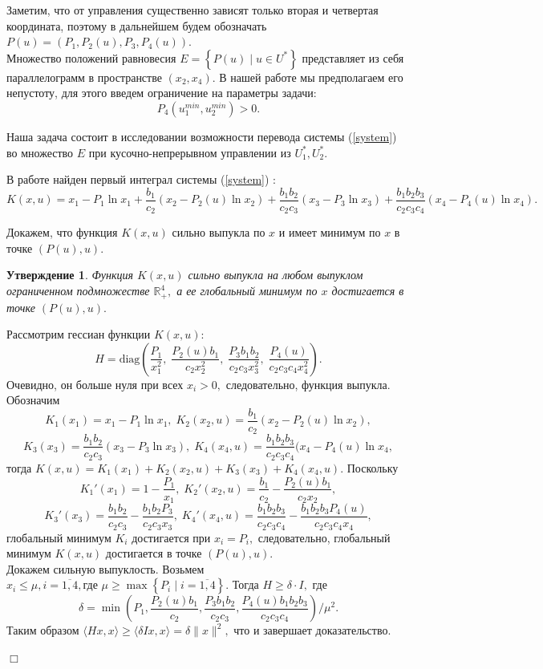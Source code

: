 \documentclass[11pt]{article}
\newtheorem{statement}{Утверждение}
\newenvironment{Proof}
{\par\noindent{\bf Доказательство.\\}} 
{\begin{flushright}$\Box$\end{flushright}}
\newcommand\Set[2]{\left\{ #1 \mid #2 \right\}}
\newcommand\Ref[1]{(\ref{#1})}
\newcommand\ftw[2]{\overline{#1,#2}}
\newcommand\RS{\Ref{system} }
\newcommand\beq{\begin{equation}}
\newcommand\eeq{\end{equation}}
\begin{document}
Заметим, что от управления существенно зависят только вторая и четвертая координата, поэтому в дальнейшем будем обозначать $P(u) = (P_1, P_2(u), P_3, P_4(u)).$ \\

Множество положений равновесия $E = \Set{P(u)}{u \in U^*}$ представляет из себя параллелограмм в пространстве $(x_2, x_4).$ В нашей работе мы предполагаем его непустоту, для этого введем ограничение на параметры задачи:
$$P_4(u_1^{min}, u_2^{min}) > 0.$$

Наша задача состоит в исследовании возможности перевода системы \RS во множество $E$ при кусочно-непрерывном управлении из $U_1^*, U_2^*.$ 

В работе \cite{MathBio} найден первый интеграл системы \RS:
\beq
	K(x,u) = x_1 - P_1\ln x_1 + \frac{b_1}{c_2}(x_2 - P_2(u)\ln x_2) + \frac{b_1b_2}{c_2c_3}(x_3 - P_3\ln x_3) + \frac{b_1b_2b_3}{c_2c_3c_4}(x_4 - P_4(u)\ln x_4).
\eeq

Докажем, что функция $K(x,u)$ сильно выпукла по $x$ и имеет минимум по $x$ в точке $(P(u),u).$

\begin{statement}
	Функция $K(x,u)$ сильно выпукла на любом выпуклом ограниченном подмножестве $\mathbb{R}_+^4,$ а ее глобальный минимум по $x$ достигается в точке $(P(u),u).$
\end{statement}
\begin{Proof}
	Рассмотрим гессиан функции $K(x,u):$
	$$H = \text{diag} \left(\frac{P_1}{x_1^2}, \; \frac{P_2(u)b_1}{c_2x_2^2}, \; \frac{P_3b_1b_2}{c_2c_3x_3^2}, \; \frac{P_4(u)}{c_2c_3c_4x_4^2}\right).$$
	Очевидно, он больше нуля при всех $x_i > 0,$ следовательно, функция выпукла.\\
	Обозначим 
	$$K_1(x_1) = x_1 - P_1\ln x_1, \; K_2(x_2,u) = \frac{b_1}{c_2}(x_2 - P_2(u)\ln x_2),$$
	$$K_3(x_3) = \frac{b_1b_2}{c_2c_3}(x_3 - P_3\ln x_3), \; K_4(x_4,u) = \frac{b_1b_2b_3}{c_2c_3c_4}(x_4 - P_4(u)\ln x_4,$$ тогда $K(x,u) =  K_1(x_1) + K_2(x_2,u) + K_3(x_3) + K_4(x_4,u).$  Поскольку 
	$$K_1'(x_1) = 1 - \frac{P_1}{x_1}, \; K_2'(x_2,u) = \frac{b_1}{c_2} - \frac{P_2(u)b_1}{c_2x_2},$$
	$$K_3'(x_3) = \frac{b_1b_2}{c_2c_3} - \frac{b_1b_2P_3}{c_2c_3x_3}, \; K_4'(x_4,u) = \frac{b_1b_2b_3}{c_2c_3c_4} - \frac{b_1b_2b_3P_4(u)}{c_2c_3c_4x_4},$$ 
	глобальный минимум $K_i$ достигается при $x_i = P_i,$ следовательно, глобальный минимум $K(x,u)$ достигается в точке $(P(u),u).$ \\
	 Докажем сильную выпуклость. Возьмем $x_i \leqslant \mu, i = \ftw{1}{4}, \text{где } \mu \geqslant \max\Set{P_i}{i = \ftw{1}{4}}.$ Тогда $H \geqslant \delta\cdot I,$ где  
	 $$\delta = \min\left(P_1, \frac{P_2(u)b_1}{c_2}, \frac{P_3b_1b_2}{c_2c_3}, \frac{P_4(u)b_1b_2b_3}{c_2c_3c_4}\right)/\mu^2.$$
	 Таким образом $\langle Hx,x \rangle \geqslant \langle \delta Ix,x \rangle = \delta \|x\|^2,$ что и завершает доказательство.
\end{Proof}
\end{document}
